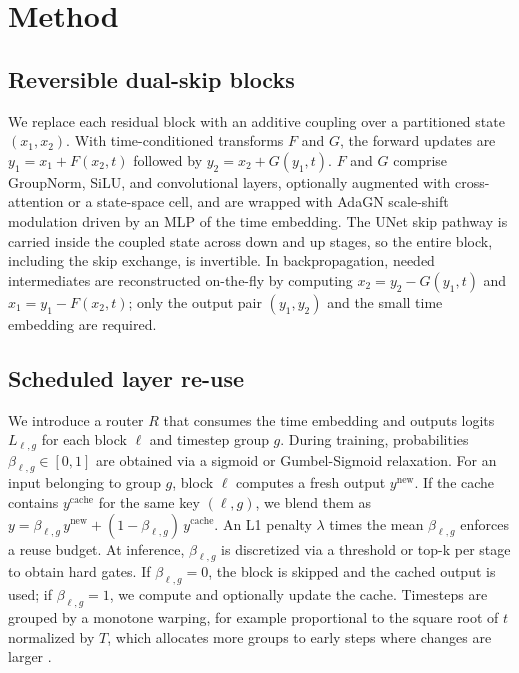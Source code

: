 \documentclass{article}
\begin{document}
\section{Method}
\subsection{Reversible dual-skip blocks}
We replace each residual block with an additive coupling over a partitioned state $(x_1, x_2)$. With time-conditioned transforms $F$ and $G$, the forward updates are $y_1 = x_1 + F(x_2, t)$ followed by $y_2 = x_2 + G(y_1, t)$. $F$ and $G$ comprise GroupNorm, SiLU, and convolutional layers, optionally augmented with cross-attention or a state-space cell, and are wrapped with AdaGN scale-shift modulation driven by an MLP of the time embedding. The UNet skip pathway is carried inside the coupled state across down and up stages, so the entire block, including the skip exchange, is invertible. In backpropagation, needed intermediates are reconstructed on-the-fly by computing $x_2 = y_2 - G(y_1, t)$ and $x_1 = y_1 - F(x_2, t)$; only the output pair $(y_1, y_2)$ and the small time embedding are required.

\subsection{Scheduled layer re-use}
We introduce a router $R$ that consumes the time embedding and outputs logits $L_{\ell,g}$ for each block $\ell$ and timestep group $g$. During training, probabilities $\beta_{\ell,g} \in [0,1]$ are obtained via a sigmoid or Gumbel-Sigmoid relaxation. For an input belonging to group $g$, block $\ell$ computes a fresh output $y^{\text{new}}$. If the cache contains $y^{\text{cache}}$ for the same key $(\ell, g)$, we blend them as $y = \beta_{\ell,g}\, y^{\text{new}} + (1 - \beta_{\ell,g})\, y^{\text{cache}}$. An L1 penalty $\lambda$ times the mean $\beta_{\ell,g}$ enforces a reuse budget. At inference, $\beta_{\ell,g}$ is discretized via a threshold or top-k per stage to obtain hard gates. If $\beta_{\ell,g} = 0$, the block is skipped and the cached output is used; if $\beta_{\ell,g} = 1$, we compute and optionally update the cache. Timesteps are grouped by a monotone warping, for example proportional to the square root of $t$ normalized by $T$, which allocates more groups to early steps where changes are larger \cite{ma_2024_learning}.
\end{document}

